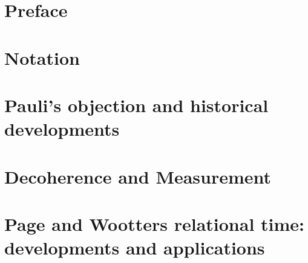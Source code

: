 




\frontmatter

\maketitle

\cleardoublepage
{}
\tableofcontents

\listoffigures

\listoftables

\chapter*{Preface}


\chapter*{Notation}


\mainmatter

\chapter{Pauli's objection and historical developments}


\chapter{Decoherence and Measurement}









\chapter{Page and Wootters relational time: developments and applications}
  \label{ch:pw}



